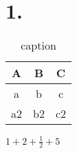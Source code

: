 \def\lecturer{LiManMan}
\def\noter{THF}
\def\className{Statistics}
\def\term{III-B}



\section{1. }%
\label{sec:1. }
\begin{table}[htpb]
    \centering
    \caption{caption}
    \label{tab:table}
    \begin{tabular}{ccc}
    \toprule
    A & B & C\\
    \midrule
    a & b & c\\ 
    a2&b2&c2\\
    \bottomrule
    \end{tabular}
\end{table}
$1+2+\frac{1}{2}+5$

